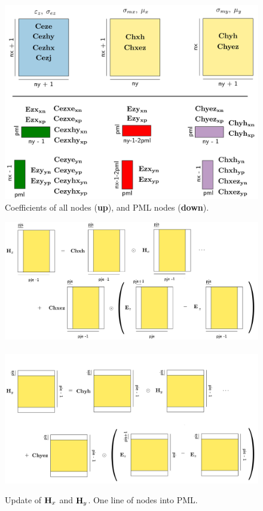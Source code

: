 \documentclass[a4paper,12pt]{article}
\begin{document}
\begin{figure}
\centering
\includegraphics[width=1\textwidth]{../pics/tikz/svg/coeff.pdf}
\caption{Coefficients of all nodes ({\bf up}), and PML nodes ({\bf down}).}
\end{figure}
%
\begin{figure}
\centering
\includegraphics[width=1\textwidth]{../pics/tikz/svg/Hx-new-inside.pdf}
~
\includegraphics[width=1\textwidth]{../pics/tikz/svg/Hy-new-inside.pdf}
\caption{Update of ${\bf H}_x$ and ${\bf H}_y$. One line of nodes into PML.}
\end{figure}
\end{document}
